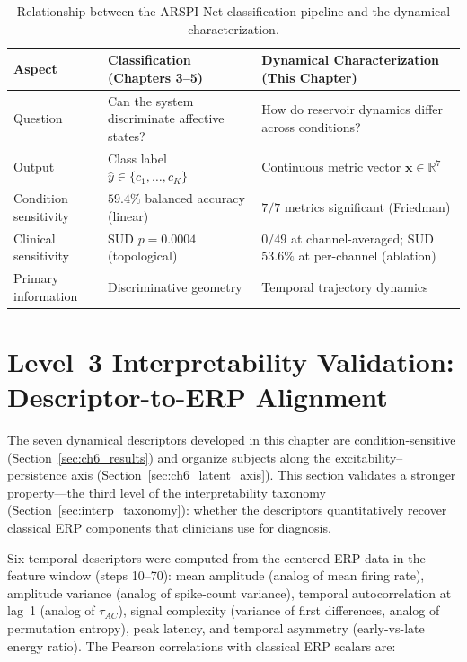 \begin{table}[H]
\centering
\caption{Relationship between the ARSPI-Net classification pipeline and the dynamical characterization.}
\label{tab:dynamics_relationship_updated}
\begin{tabularx}{\textwidth}{>{\raggedright\arraybackslash}p{} >{\raggedright\arraybackslash}X >{\raggedright\arraybackslash}X}
\toprule
\textbf{Aspect} & \textbf{Classification (Chapters 3--5)} & \textbf{Dynamical Characterization (This Chapter)} \\
\midrule
Question & Can the system discriminate affective states? & How do reservoir dynamics differ across conditions? \\
Output & Class label $\hat{y}\in\{c_1,\ldots,c_K\}$ & Continuous metric vector $\mathbf{x}\in\mathbb{R}^7$ \\
Condition sensitivity & $59.4\%$ balanced accuracy (linear) & $7/7$ metrics significant (Friedman) \\
Clinical sensitivity & SUD $p = 0.0004$ (topological) & $0/49$ at channel-averaged; SUD $53.6\%$ at per-channel (ablation) \\
Primary information & Discriminative geometry & Temporal trajectory dynamics \\
\bottomrule
\end{tabularx}
\end{table}


\section{Level~3 Interpretability Validation: Descriptor-to-ERP Alignment}
\label{sec:ch6_erp_alignment}

The seven dynamical descriptors developed in this chapter are condition-sensitive (Section~\ref{sec:ch6_results}) and organize subjects along the excitability--persistence axis (Section~\ref{sec:ch6_latent_axis}). This section validates a stronger property---the third level of the interpretability taxonomy (Section~\ref{sec:interp_taxonomy}): whether the descriptors quantitatively recover classical ERP components that clinicians use for diagnosis.

Six temporal descriptors were computed from the centered ERP data in the feature window (steps 10--70): mean amplitude (analog of mean firing rate), amplitude variance (analog of spike-count variance), temporal autocorrelation at lag~1 (analog of $\tau_{AC}$), signal complexity (variance of first differences, analog of permutation entropy), peak latency, and temporal asymmetry (early-vs-late energy ratio). The Pearson correlations with classical ERP scalars are:

